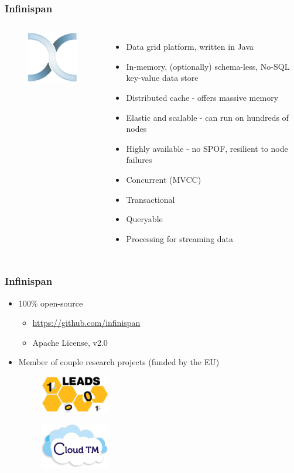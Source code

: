 \documentclass[10pt,utf8]{beamer}
\begin{document}
\begin{frame}
	\frametitle{Infinispan}
	\begin{columns}
		\begin{figure}
			\centering
			\includegraphics[width=3cm]{./img/infinispan.eps}
		\end{figure}
		\begin{itemize}
			\item Data grid platform, written in Java
			\item In-memory, (optionally) schema-less, No-SQL key-value data store
			\item Distributed cache - offers massive memory
			\item Elastic and scalable - can run on hundreds of nodes
			\item Highly available - no SPOF, resilient to node failures
			\item Concurrent (MVCC)
			\item Transactional
			\item Queryable
			\item Processing for streaming data
		\end{itemize}
	\end{columns}
\end{frame}

\begin{frame}
	\frametitle{Infinispan}
	\begin{itemize}
		\item 100\% open-source
		\begin{itemize}
			\item \url{https://github.com/infinispan}
			\item Apache License, v2.0
		\end{itemize}
		\item Member of couple research projects (funded by the EU)
			\begin{figure}
				\centering
				\includegraphics[width=3cm]{./img/leads.eps}
			\end{figure}
			\vspace{0.5cm}
			\begin{figure}
				\centering
				\includegraphics[width=3cm]{./img/cloudTM.eps}
			\end{figure}
	\end{itemize}
\end{frame}
\end{document}
